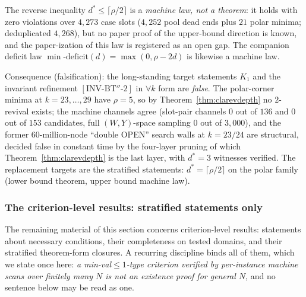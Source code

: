 \begin{remark}
\label{rem:cladstarlaw}
The reverse inequality $d^*\le\lceil\rho/2\rceil$ is a \emph{machine law,
not a theorem}: it holds with zero violations over $4{,}273$ case slots
($4{,}252$ pool dead ends plus $21$ polar minima; deduplicated $4{,}268$),
but no paper proof of the upper-bound direction is known, and the
paper-ization of this law is registered as an open gap. The companion
deficit law $\min\text{-}\mathrm{deficit}(d)=\max(0,\rho-2d)$ is likewise
a machine law.

Consequence (falsification): the long-standing target statements $K_1$ and
the invariant refinement $[\mathrm{INV}\text{-}\mathrm{BT}''\text{-}2]$ in
$\forall k$ form are \emph{false}. The polar-corner minima at
$k=23,\dots,29$ have $\rho=5$, so by Theorem~\ref{thm:clarevdepth} no
$2$-revival exists; the machine channels agree (slot-pair channels $0$
out of $136$ and $0$ out of $153$ candidates, full $(W,Y)$-space sampling
$0$ out of $3{,}000$), and the former $60$-million-node ``double OPEN''
search walls at $k=23/24$ are structural, decided false in constant time
by the four-layer pruning of which Theorem~\ref{thm:clarevdepth} is the
last layer, with $d^*=3$ witnesses verified. The replacement targets are
the stratified statements: $d^*=\lceil\rho/2\rceil$ on the polar family
(lower bound theorem, upper bound machine law).
\end{remark}

\subsubsection{The criterion-level results: stratified statements only}
\label{subsubsec:criteria}

The remaining material of this section concerns criterion-level results:
statements about necessary conditions, their completeness on tested
domains, and their stratified theorem-form closures. A recurring discipline
binds all of them, which we state once here: \emph{a min-val$\le1$-type
criterion verified by per-instance machine scans over finitely many $N$ is
not an existence proof for general $N$}, and no sentence below may be read
as one.

